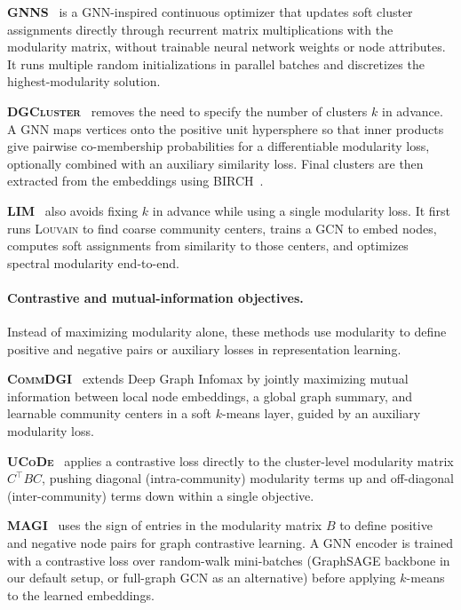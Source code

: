 \documentclass[11pt,a4paper]{article}
\begin{document}
\textbf{\textsc{GNNS}}~\cite{gnns2022} is a GNN-inspired continuous optimizer that updates soft cluster assignments directly through recurrent matrix multiplications with the modularity matrix, without trainable neural network weights or node attributes. It runs multiple random initializations in parallel batches and discretizes the highest-modularity solution.

\textbf{\textsc{DGCluster}}~\cite{dgcluster2024} removes the need to specify the number of clusters $k$ in advance. A GNN maps vertices onto the positive unit hypersphere so that inner products give pairwise co-membership probabilities for a differentiable modularity loss, optionally combined with an auxiliary similarity loss. Final clusters are then extracted from the embeddings using \textsc{BIRCH}~\cite{birch1996}.

\textbf{\textsc{LIM}}~\cite{lim2025} also avoids fixing $k$ in advance while using a single modularity loss. It first runs \textsc{Louvain} to find coarse community centers, trains a GCN to embed nodes, computes soft assignments from similarity to those centers, and optimizes spectral modularity end-to-end.

\paragraph*{\textbf{Contrastive and mutual-information objectives.}}
Instead of maximizing modularity alone, these methods use modularity to define positive and negative pairs or auxiliary losses in representation learning.

\textbf{\textsc{CommDGI}}~\cite{commdgi2020} extends Deep Graph Infomax by jointly maximizing mutual information between local node embeddings, a global graph summary, and learnable community centers in a soft $k$-means layer, guided by an auxiliary modularity loss.

\textbf{\textsc{UCoDe}}~\cite{ucode2023} applies a contrastive loss directly to the cluster-level modularity matrix $C^\top B C$, pushing diagonal (intra-community) modularity terms up and off-diagonal (inter-community) terms down within a single objective.

\textbf{\textsc{MAGI}}~\cite{magi2024} uses the sign of entries in the modularity matrix $B$ to define positive and negative node pairs for graph contrastive learning. A GNN encoder is trained with a contrastive loss over random-walk mini-batches (GraphSAGE backbone in our default setup, or full-graph GCN as an alternative) before applying $k$-means to the learned embeddings.
\end{document}
